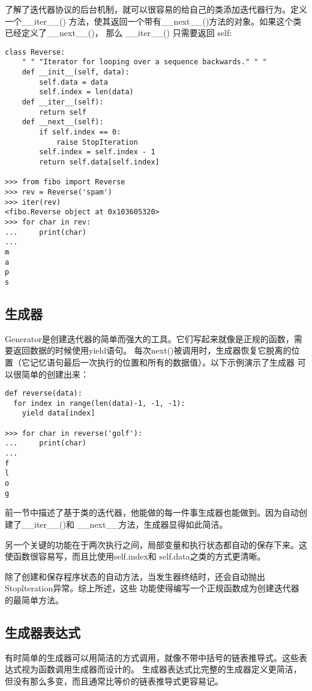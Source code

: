 \documentclass[UTF8]{ctexart}
\begin{document}
了解了迭代器协议的后台机制，就可以很容易的给自己的类添加迭代器行为。定义一个\_\_iter\_\_()
方法，使其返回一个带有\_\_next\_\_()方法的对象。如果这个类已经定义了\_\_next\_\_()，
那么 \_\_iter\_\_() 只需要返回 self:
\begin{verbatim}
class Reverse:
    " " "Iterator for looping over a sequence backwards." " "
    def __init__(self, data):
        self.data = data
        self.index = len(data)
    def __iter__(self):
        return self
    def __next__(self):
        if self.index == 0:
            raise StopIteration
        self.index = self.index - 1
        return self.data[self.index]

>>> from fibo import Reverse
>>> rev = Reverse('spam')
>>> iter(rev)
<fibo.Reverse object at 0x103605320>
>>> for char in rev:
...     print(char)
...
m
a
p
s
\end{verbatim}

\subsection{生成器}
Generator是创建迭代器的简单而强大的工具。它们写起来就像是正规的函数，需要返回数据的时候使用yield语句。
每次next()被调用时，生成器恢复它脱离的位置（它记忆语句最后一次执行的位置和所有的数据值）。以下示例演示了生成器
可以很简单的创建出来：
\begin{verbatim}
def reverse(data):
  for index in range(len(data)-1, -1, -1):
    yield data[index]

>>> for char in reverse('golf'):
...     print(char)
...
f
l
o
g
\end{verbatim}
前一节中描述了基于类的迭代器，他能做的每一件事生成器也能做到。因为自动创建了\_\_iter\_\_()和
\_\_next\_\_方法，生成器显得如此简洁。

另一个关键的功能在于两次执行之间，局部变量和执行状态都自动的保存下来。这使函数很容易写，而且比使用self.index和
self.data之类的方式更清晰。

除了创建和保存程序状态的自动方法，当发生器终结时，还会自动抛出Stoplteration异常。综上所述，这些
功能使得编写一个正规函数成为创建迭代器的最简单方法。

\subsection{生成器表达式}
有时简单的生成器可以用简洁的方式调用，就像不带中括号的链表推导式。这些表达式视为函数调用生成器而设计的。
生成器表达式比完整的生成器定义更简洁，但没有那么多变，而且通常比等价的链表推导式更容易记。
\end{document}
